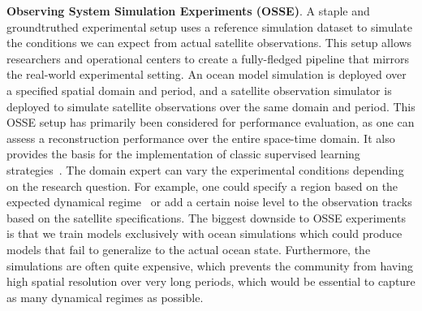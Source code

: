 \textbf{Observing System Simulation Experiments (OSSE)}. A staple and groundtruthed experimental setup uses a reference simulation dataset to simulate the conditions we can expect from actual satellite observations. 
This setup allows researchers and operational centers to create a fully-fledged pipeline that mirrors the real-world experimental setting.
An ocean model simulation is deployed over a specified spatial domain and period, and a satellite observation simulator is deployed to simulate satellite observations over the same domain and period. 
This OSSE setup has primarily been considered for performance evaluation, as one can assess a reconstruction performance over the entire space-time domain. It also provides the basis for the implementation of classic supervised learning strategies~\cite{SSHInterpUNet,SSHInterpConvLSTM,SSHInterpAttention}.
The domain expert can vary the experimental conditions depending on the research question. 
For example, one could specify a region based on the expected dynamical regime~\cite{DCOSSEGULFSSH} or add a certain noise level to the observation tracks based on the satellite specifications.
The biggest downside to OSSE experiments is that we train models exclusively with ocean simulations which could produce models that fail to generalize to the actual ocean state. 
Furthermore, the simulations are often quite expensive, which prevents the community from having high spatial resolution over very long periods, which would be essential to capture as many dynamical regimes as possible.


